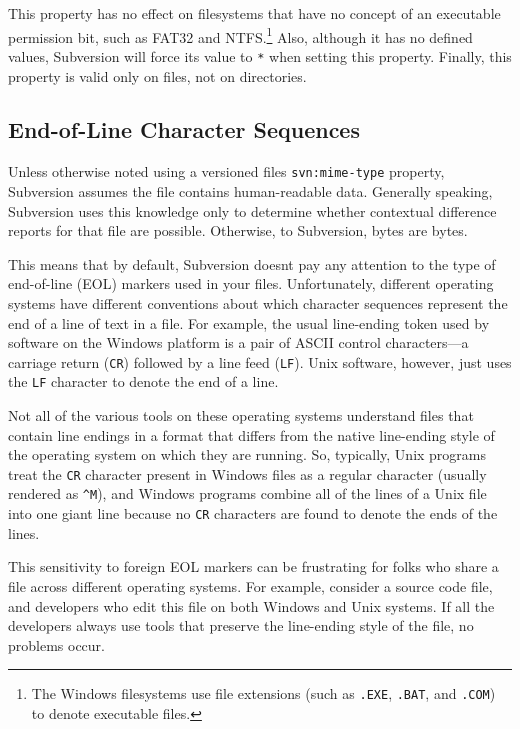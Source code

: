 This property has no effect on filesystems that have no concept of an
executable permission bit, such as FAT32 and NTFS.\footnote{The Windows
  filesystems use file extensions (such as \texttt{.EXE}, \texttt{.BAT},
  and \texttt{.COM}) to denote executable files.} Also, although it has
no defined values, Subversion will force its value to \texttt{*} when
setting this property. Finally, this property is valid only on files,
not on directories.

\subsection{End-of-Line Character
Sequences}\label{svn.advanced.props.special.eol-style}

Unless otherwise noted using a versioned file\textquotesingle s
\texttt{svn:mime-type} property, Subversion assumes the file contains
human-readable data. Generally speaking, Subversion uses this knowledge
only to determine whether contextual difference reports for that file
are possible. Otherwise, to Subversion, bytes are bytes.

This means that by default, Subversion doesn\textquotesingle t pay any
attention to the type of end-of-line (EOL) markers used in your files.
Unfortunately, different operating systems have different conventions
about which character sequences represent the end of a line of text in a
file. For example, the usual line-ending token used by software on the
Windows platform is a pair of ASCII control characters---a carriage
return (\texttt{CR}) followed by a line feed (\texttt{LF}). Unix
software, however, just uses the \texttt{LF} character to denote the end
of a line.

Not all of the various tools on these operating systems understand files
that contain line endings in a format that differs from the native
line-ending style of the operating system on which they are running. So,
typically, Unix programs treat the \texttt{CR} character present in
Windows files as a regular character (usually rendered as
\texttt{\^{}M}), and Windows programs combine all of the lines of a Unix
file into one giant line because no \texttt{CR} characters are found to
denote the ends of the lines.

This sensitivity to foreign EOL markers can be frustrating for folks who
share a file across different operating systems. For example, consider a
source code file, and developers who edit this file on both Windows and
Unix systems. If all the developers always use tools that preserve the
line-ending style of the file, no problems occur.

